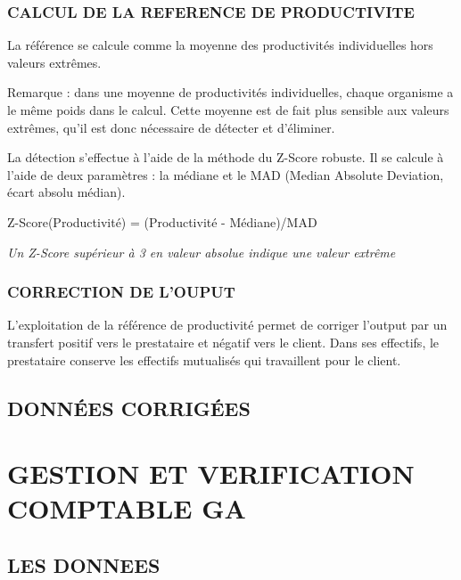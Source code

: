 \documentclass[
]{book}
\begin{document}
\hypertarget{calcul-de-la-reference-de-productivite-2}{%
\subsection{CALCUL DE LA REFERENCE DE PRODUCTIVITE}\label{calcul-de-la-reference-de-productivite-2}}

La référence se calcule comme la moyenne des productivités individuelles hors valeurs extrêmes.

Remarque : dans une moyenne de productivités individuelles, chaque organisme a le même poids dans le calcul. Cette moyenne est de fait plus sensible aux valeurs extrêmes, qu'il est donc nécessaire de détecter et d'éliminer.

La détection s'effectue à l'aide de la méthode du Z-Score robuste.
Il se calcule à l'aide de deux paramètres : la médiane et le MAD (Median Absolute Deviation, écart absolu médian).

Z-Score(Productivité) = (Productivité - Médiane)/MAD

\emph{Un Z-Score supérieur à 3 en valeur absolue indique une valeur extrême}

\hypertarget{correction-de-louput-2}{%
\subsection{CORRECTION DE L'OUPUT}\label{correction-de-louput-2}}

L'exploitation de la référence de productivité permet de corriger l'output par un transfert positif vers le prestataire et négatif vers le client.
Dans ses effectifs, le prestataire conserve les effectifs mutualisés qui travaillent pour le client.

\hypertarget{donnuxe9es-corriguxe9es-2}{%
\section{DONNÉES CORRIGÉES}\label{donnuxe9es-corriguxe9es-2}}

\hypertarget{gestion-et-verification-comptable-ga}{%
\chapter{GESTION ET VERIFICATION COMPTABLE GA}\label{gestion-et-verification-comptable-ga}}

\hypertarget{les-donnees-14}{%
\section{LES DONNEES}\label{les-donnees-14}}
\end{document}
